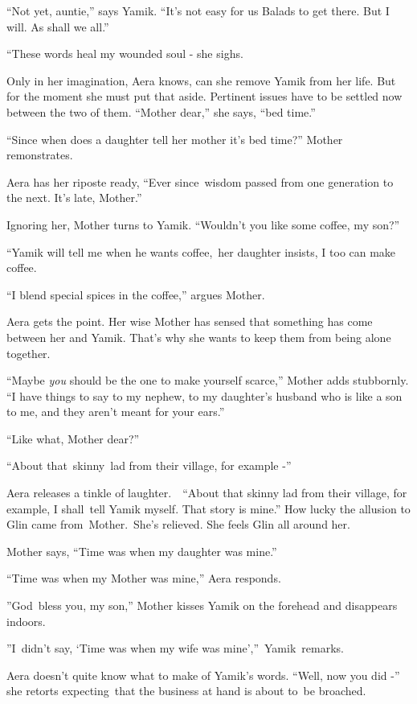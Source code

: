 \documentclass[twoside,11pt]{book}
\begin{document}
{}``Not yet, auntie,'' says Yamik. ``It's not easy for us Balads to get there. But I will. As shall we all.'' 

{}``These words heal my wounded soul -{\textquotedbl} she sighs.

Only in her imagination, Aera knows, can she remove Yamik from her life. But for the moment she must put that aside.
Pertinent issues have to be settled now between the two of them. ``Mother dear,'' she says, ``bed time.''~ 

{}``Since when does a daughter tell her mother it's bed time?''  Mother remonstrates.

Aera has her riposte ready, ``Ever since~wisdom passed from one generation to the next. It's late, Mother.'' 

Ignoring her, Mother turns to Yamik. {}``Wouldn't you like some coffee, my son?''\ 

{}``Yamik will tell me when he wants coffee,{\textquotedbl}\ her daughter insists, {\textquotedbl}I too can make
coffee.{\textquotedbl}

{}``I blend special spices in the coffee,'' argues Mother. 

Aera gets the point. Her wise Mother has sensed that something has come between her and Yamik. That's why she wants to
keep them from being alone together. 

{}``Maybe \textit{you} should be the one to make yourself scarce,'' Mother adds stubbornly. ``I have things to say to my
nephew, to my daughter's husband who is like a son to me, and they aren't meant for your ears.'' 

{}``Like what, Mother dear?'' 

{}``About that\ skinny{\ }lad from their village, for example -{}'' 

Aera releases a tinkle of laughter.\ ~``About that skinny lad from their village, for example, I shall~tell Yamik
myself. That story is mine.'' How lucky the allusion to Glin came from\ Mother.\ She{}'s relieved. She feels Glin all
around her. 

Mother says, ``Time was when my daughter was mine.'' 

 ``Time was when my Mother was mine,{}'' Aera responds.

{}''God\ bless you, my son,'' Mother kisses Yamik on the forehead and disappears indoors.

{}''I\ didn't say, `Time was when my wife was mine',{}''\ Yamik\ remarks.

Aera doesn't quite know what to make of Yamik's words. ``Well, now you did{
-}{}'' she retorts expecting\ that the business at hand is about to~be broached. 
\end{document}

